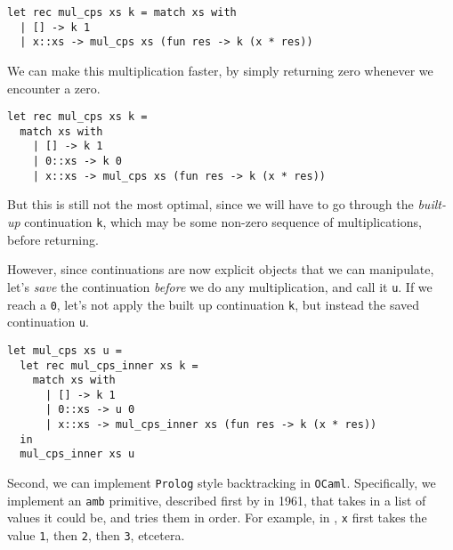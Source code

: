\begin{code}
\label{code:mul-ocaml-fast}
\begin{verbatim}
let rec mul_cps xs k = match xs with
  | [] -> k 1
  | x::xs -> mul_cps xs (fun res -> k (x * res))
\end{verbatim}
\end{code}

We can make this multiplication faster, by simply returning zero whenever we encounter a zero. 

\begin{code}
\label{code:mul-ocaml-fastest}
\begin{verbatim}
let rec mul_cps xs k = 
  match xs with
    | [] -> k 1
    | 0::xs -> k 0
    | x::xs -> mul_cps xs (fun res -> k (x * res))
\end{verbatim}
\end{code}

But this is still not the most optimal, since we will have to go through the \emph{built-up} continuation \texttt{k}, which may be some non-zero sequence of multiplications, before returning. 

However, since continuations are now explicit objects that we can manipulate, let's \emph{save} the continuation \emph{before} we do any multiplication, and call it \texttt{u}. If we reach a \texttt{0}, let's not apply the built up continuation \texttt{k}, but instead the saved continuation \texttt{u}.

\begin{code}
\label{code:fib-ocaml-again}
\begin{verbatim}
let mul_cps xs u = 
  let rec mul_cps_inner xs k = 
    match xs with
      | [] -> k 1
      | 0::xs -> u 0
      | x::xs -> mul_cps_inner xs (fun res -> k (x * res))
  in
  mul_cps_inner xs u
\end{verbatim}
\end{code}

Second, we can implement \texttt{Prolog} style backtracking in \texttt{OCaml}. Specifically, we implement an \texttt{amb} primitive, described first by \citet{mccarthy-1963} in 1961, that takes in a list of values it could be, and tries them in order. For example, in , \texttt{x} first takes the value \texttt{1}, then \texttt{2}, then \texttt{3}, etcetera.

